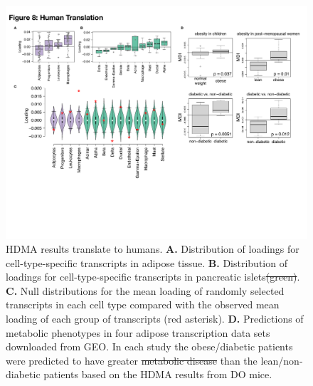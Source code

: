\documentclass[
]{article}
\providecommand{\DIFaddtex}[1]{{\protect\color{blue}\uwave{#1}}} %
\providecommand{\DIFdeltex}[1]{{\protect\color{red}\sout{#1}}}                      %
\providecommand{\DIFaddFL}[1]{\DIFadd{#1}} %
\providecommand{\DIFdelFL}[1]{\DIFdel{#1}} %
\providecommand{\DIFaddbeginFL}{} %
\providecommand{\DIFaddendFL}{} %
\providecommand{\DIFdelbeginFL}{} %
\providecommand{\DIFdelendFL}{} %
\providecommand{\DIFadd}[1]{\texorpdfstring{\DIFaddtex{#1}}{#1}} %
\providecommand{\DIFdel}[1]{\texorpdfstring{\DIFdeltex{#1}}{}} %
\newcommand{\DIFscaledelfig}{0.5}
\newlength{\DIFdelgraphicswidth} %
\newlength{\DIFdelgraphicsheight} %
\newcommand{\DIFaddincludegraphics}[2][]{{\color{blue}\fbox{\DIFOincludegraphics[#1]{#2}}}} %
\newcommand{\DIFdelincludegraphics}[2][]{%
\sbox{\DIFdelgraphicsbox}{\DIFOincludegraphics[#1]{#2}}%
\settoboxwidth{\DIFdelgraphicswidth}{\DIFdelgraphicsbox} %
\settoboxtotalheight{\DIFdelgraphicsheight}{\DIFdelgraphicsbox} %
\scalebox{\DIFscaledelfig}{%
\parbox[b]{\DIFdelgraphicswidth}{\usebox{\DIFdelgraphicsbox}\\[-\baselineskip] \rule{\DIFdelgraphicswidth}{0em}}\llap{\resizebox{\DIFdelgraphicswidth}{\DIFdelgraphicsheight}{%
\setlength{\unitlength}{\DIFdelgraphicswidth}%
\begin{picture}(1,1)%
\thicklines\linethickness{2pt} %
{\color[rgb]{1,0,0}\put(0,0){\framebox(1,1){}}}%
{\color[rgb]{1,0,0}\put(0,0){\line( 1,1){1}}}%
{\color[rgb]{1,0,0}\put(0,1){\line(1,-1){1}}}%
\end{picture}%
}\hspace*{3pt}}} %
} %
\DeclareRobustCommand{\DIFaddbeginFL}{\DIFOaddbeginFL \let\includegraphics\DIFaddincludegraphics} %
\DeclareRobustCommand{\DIFaddendFL}{\DIFOaddendFL \let\includegraphics\DIFOincludegraphics} %
\DeclareRobustCommand{\DIFdelbeginFL}{\DIFOdelbeginFL \let\includegraphics\DIFdelincludegraphics} %
\DeclareRobustCommand{\DIFdelendFL}{\DIFOaddendFL \let\includegraphics\DIFOincludegraphics} %
\begin{document}
\begin{figure}[ht!]
\includegraphics[width=\textwidth]{Figures/Fig8_Human_Translation.pdf} 
\caption{HDMA results translate to humans. \textbf{A.} Distribution of 
loadings for cell-type-specific transcripts in adipose tissue. \textbf{B.} 
Distribution of loadings for cell-type-specific transcripts in pancreatic 
islets\DIFdelbeginFL \DIFdelFL{(green)}\DIFdelendFL . \textbf{C.} Null distributions for the mean loading of 
randomly selected transcripts in each cell type compared with the observed 
mean loading of each group of transcripts (red asterisk). \textbf{D.} 
Predictions of metabolic phenotypes in four adipose transcription data 
sets downloaded from GEO. In each study the obese/diabetic patients were 
predicted to have greater \DIFdelbeginFL \DIFdelFL{metabolic disease }\DIFdelendFL \DIFaddbeginFL \DIFaddFL{MDI }\DIFaddendFL than the lean/non-diabetic 
patients based on the HDMA results from DO mice.
}
\label{fig:human_translation}
\end{figure}
\end{document}
